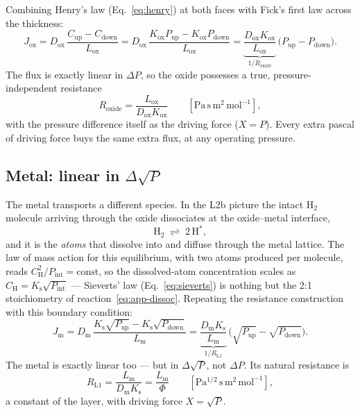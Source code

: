 \documentclass[11pt,a4paper]{article}
\newcommand{\Pup}{P_{\mathrm{up}}}
\newcommand{\Pdown}{P_{\mathrm{down}}}
\newcommand{\Pint}{P_{\mathrm{int}}}
\newcommand{\Ks}{K_{\mathrm{s}}}
\newcommand{\Kox}{K_{\mathrm{ox}}}
\newcommand{\Dm}{D_{\mathrm{m}}}
\newcommand{\Dox}{D_{\mathrm{ox}}}
\newcommand{\Lm}{L_{\mathrm{m}}}
\newcommand{\Lox}{L_{\mathrm{ox}}}
\newcommand{\Rox}{R_{\mathrm{oxide}}}
\begin{document}
Combining Henry's law (Eq.~\eqref{eq:henry}) at both faces with Fick's first
law across the thickness:
\begin{equation}
  J_{\mathrm{ox}}
  = \Dox\,\frac{C_{\mathrm{up}} - C_{\mathrm{down}}}{\Lox}
  = \Dox\,\frac{\Kox \Pup - \Kox \Pdown}{\Lox}
  = \underbrace{\frac{\Dox\Kox}{\Lox}}_{1/\Rox}\,\bigl(\Pup - \Pdown\bigr).
  \label{eq:app-oxide}
\end{equation}
The flux is exactly linear in $\Delta P$, so the oxide possesses a true,
pressure-independent resistance
\begin{equation}
  \Rox = \frac{\Lox}{\Dox\Kox}
  \qquad [\mathrm{Pa\,s\,m^{2}\,mol^{-1}}],
  \label{eq:app-Rox}
\end{equation}
with the pressure difference itself as the driving force
($X = P$). Every extra pascal of driving force buys the same extra flux,
at any operating pressure.

\subsection{Metal: linear in $\Delta\sqrt{P}$}

The metal transports a different species. In the L2b picture the intact
$\mathrm{H_2}$ molecule arriving through the oxide dissociates at the
oxide--metal interface,
\begin{equation}
  \mathrm{H_2} \;\rightleftharpoons\; 2\,\mathrm{H}^{*},
  \label{eq:app-dissoc}
\end{equation}
and it is the \emph{atoms} that dissolve into and diffuse through the metal
lattice. The law of mass action for this equilibrium, with two atoms produced
per molecule, reads $C_{\mathrm{H}}^{2}/\Pint = \text{const}$, so the
dissolved-atom concentration scales as $C_{\mathrm{H}} = \Ks\sqrt{\Pint}$ ---
Sieverts' law (Eq.~\eqref{eq:sieverts}) is nothing but the 2:1 stoichiometry
of reaction~\eqref{eq:app-dissoc}. Repeating the resistance construction with
this boundary condition:
\begin{equation}
  J_{\mathrm{m}}
  = \Dm\,\frac{\Ks\sqrt{\Pup} - \Ks\sqrt{\Pdown}}{\Lm}
  = \underbrace{\frac{\Dm\Ks}{\Lm}}_{1/R_{\mathrm{L1}}}\,
    \bigl(\sqrt{\Pup} - \sqrt{\Pdown}\bigr).
  \label{eq:app-metal}
\end{equation}
The metal is exactly linear too --- but in $\Delta\sqrt{P}$, not $\Delta P$.
Its natural resistance is
\begin{equation}
  R_{\mathrm{L1}} = \frac{\Lm}{\Dm\Ks} = \frac{\Lm}{\Phi}
  \qquad [\mathrm{Pa^{1/2}\,s\,m^{2}\,mol^{-1}}],
  \label{eq:app-RL1}
\end{equation}
a constant of the layer, with driving force $X = \sqrt{P}$.
\end{document}
